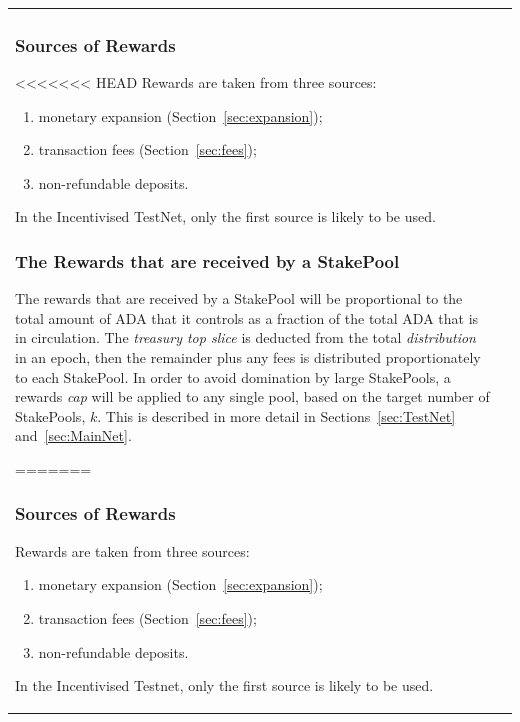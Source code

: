 \documentclass[11pt,a4paper,dvipsnames,twosided,final]{article}
\newcommand{\khcomment}[1]{\todo[color=blue!20]{KH: #1}}
\newcommand{\ada}{ADA{}}
\begin{document}
\begin{tabular}{||l|l||}
\subsubsection*{Sources of Rewards}

<<<<<<< HEAD
Rewards are taken from three sources:

\begin{enumerate}
\item
  monetary expansion (Section~\ref{sec:expansion});
\item
  transaction fees (Section~\ref{sec:fees});
\item
  non-refundable deposits.
\end{enumerate}

\noindent
In the Incentivised TestNet, only the first source is likely to be used.

\subsubsection*{The Rewards that are received by a StakePool}

The rewards that are received by a StakePool will be proportional to the total amount of \ada{} that it controls
as a fraction of the total \ada{} that is in circulation.  The \emph{treasury top slice} is deducted from the total \emph{distribution}
in an epoch, then the remainder plus any fees is distributed proportionately to each StakePool.  In order to avoid domination by large StakePools,
a rewards \emph{cap} will be applied to any single pool, based on the target number of StakePools, $k$.
This is described in more detail in Sections~\ref{sec:TestNet} and~\ref{sec:MainNet}.

=======
\subsubsection*{Sources of Rewards}

Rewards are taken from three sources:

\begin{enumerate}
\item
  monetary expansion (Section~\ref{sec:expansion});
\item
  transaction fees (Section~\ref{sec:fees});
\item
  non-refundable deposits.
\end{enumerate}

\noindent
In the Incentivised Testnet, only the first source is likely to be used.


\end{tabular}
\end{document}
